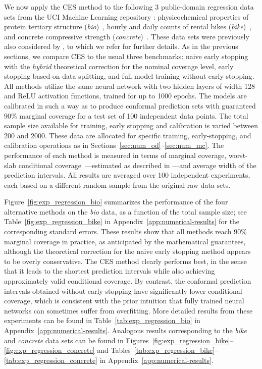 We now apply the CES method to the following 3 public-domain regression data sets from the UCI Machine Learning repository \cite{Pinar2012}: physicochemical properties of protein tertiary structure ({\em bio})~\cite{data-bio}, hourly and daily counts of rental bikes ({\em bike})~\cite{data-bike}, and concrete compressive strength ({\em concrete})~\cite{data-concrete}. These data sets were previously also considered by \citet{romano2019conformalized}, to which we refer for further details.
As in the previous sections, we compare CES to the usual three benchmarks: naive early stopping with the {\em hybrid} theoretical correction for the nominal coverage level, early stopping based on data splitting, and full model training without early stopping.
All methods utilize the same neural network with two hidden layers of width 128 and ReLU activation functions, trained for up to 1000 epochs.
The models are calibrated in such a way as to produce conformal prediction sets with guaranteed 90\% marginal coverage for a test set of 100 independent data points.
The total sample size available for training, early stopping and calibration is varied between 200 and 2000.
These data are allocated for specific training, early-stopping, and calibration operations as in Sections~\ref{sec:num_od}--\ref{sec:num_mc}.
The performance of each method is measured in terms of marginal coverage, worst-slab conditional coverage~\cite{cauchois2020knowing}---estimated as described in \citet{sesia2020comparison}---and average width of the prediction intervals. All results are averaged over 100 independent experiments, each based on a different random sample from the original raw data sets.


Figure~\ref{fig:exp_regression_bio} summarizes the performance of the four alternative methods on the {\em bio} data, as a function of the total sample size;  see Table~\ref{fig:exp_regression_bike} in Appendix~\ref{app:numerical-results} for the corresponding standard errors. These results show that all methods reach 90\% marginal coverage in practice, as anticipated by the mathematical guarantees, although the theoretical correction for the naive early stopping method appears to be overly conservative. The CES method clearly performs best, in the sense that it leads to the shortest prediction intervals while also achieving approximately valid conditional coverage. By contrast, the conformal prediction intervals obtained without early stopping have significantly lower conditional coverage, which is consistent with the prior intuition that fully trained neural networks can sometimes suffer from overfitting.
More detailed results from these experiments can be found in Table~\ref{tab:exp_regression_bio} in Appendix~\ref{app:numerical-results}.
Analogous results corresponding to the {\em bike} and {\em concrete} data sets can be found in Figures~\ref{fig:exp_regression_bike}--\ref{fig:exp_regression_concrete} and Tables~\ref{tab:exp_regression_bike}--\ref{tab:exp_regression_concrete} in Appendix~\ref{app:numerical-results}.


